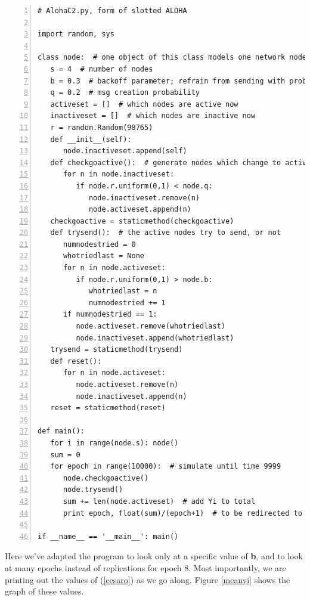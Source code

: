\begin{Verbatim}[fontsize=\relsize{-2},numbers=left]
# AlohaC2.py, form of slotted ALOHA

import random, sys 

class node:  # one object of this class models one network node
   s = 4  # number of nodes
   b = 0.3  # backoff parameter; refrain from sending with probability b
   q = 0.2  # msg creation probability
   activeset = []  # which nodes are active now
   inactiveset = []  # which nodes are inactive now
   r = random.Random(98765)  
   def __init__(self):  
      node.inactiveset.append(self)
   def checkgoactive():  # generate nodes which change to active
      for n in node.inactiveset:
         if node.r.uniform(0,1) < node.q:
            node.inactiveset.remove(n)
            node.activeset.append(n)
   checkgoactive = staticmethod(checkgoactive)  
   def trysend():  # the active nodes try to send, or not
      numnodestried = 0  
      whotriedlast = None  
      for n in node.activeset:
         if node.r.uniform(0,1) > node.b:
            whotriedlast = n
            numnodestried += 1
      if numnodestried == 1:
         node.activeset.remove(whotriedlast)
         node.inactiveset.append(whotriedlast)
   trysend = staticmethod(trysend)  
   def reset():  
      for n in node.activeset:
         node.activeset.remove(n)
         node.inactiveset.append(n)
   reset = staticmethod(reset)  
            
def main():
   for i in range(node.s): node()
   sum = 0  
   for epoch in range(10000):  # simulate until time 9999
      node.checkgoactive()
      node.trysend()
      sum += len(node.activeset)  # add Yi to total
      print epoch, float(sum)/(epoch+1)  # to be redirected to a file

if __name__ == '__main__': main()
\end{Verbatim}

Here we've adapted the program to look only at a specific value of {\bf
b}, and to look at many epochs instead of replications for epoch 8.
Most importantly, we are printing out the values of (\ref{cesaro}) as we
go along.  Figure \ref{meanyi} shows the graph of these values. 


